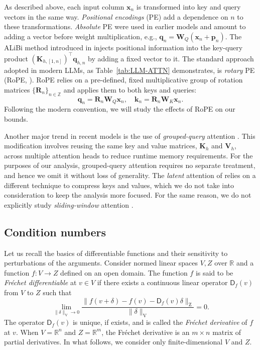 \documentclass[namedate,webpdf,imanum]{ima-authoring-template}
\newcommand{\Real}{\mathbb{R}}
\newcommand{\Z}{\mathbb{Z}}
\newcommand{\Matrix}[1]{\mathbf{#1}}
\newcommand{\trans}{\intercal}
\newcommand{\Norm}[3][]{#1\| #2 #1\|_{\mathrm{#3}}}
\newcommand{\Layer}[1]{\mathsf{#1}}
\numberwithin{equation}{section}
\begin{document}
As described above, each input column $\Matrix{x}_n$ is transformed into key and query vectors in the same way.
\emph{Positional encodings} (PE) add a dependence on $n$ to these transformations.
\emph{Absolute} PE were used in earlier models and amount to adding a vector before weight multiplication, e.g., $\Matrix{q}_{n} = \Matrix{W}_{Q} (\Matrix{x}_n + \Matrix{p}_n)$.
The ALiBi method introduced in \cite{press2021train} injects positional information into the key-query product $(\Matrix{K}_{h, [1,n]})^\trans \Matrix{q}_{h,n}$ by adding a fixed vector to it.
The standard approach adopted in modern LLMs, as Table~\ref{tab:LLM-ATTN} demonstrates, is \emph{rotary} PE (RoPE, \cite{su2024roformer}). 
RoPE relies on a pre-defined, fixed multiplicative group of rotation matrices $\{ \Matrix{R}_n \}_{n \in \Z}$ and applies them to both keys and queries:
\begin{equation*}
    \Matrix{q}_{n} = \Matrix{R}_n \Matrix{W}_{Q} \Matrix{x}_n, \quad \Matrix{k}_{n} = \Matrix{R}_n \Matrix{W}_{K} \Matrix{x}_n.
\end{equation*}
Following the modern convention, we will study the effects of RoPE on our bounds.

Another major trend in recent models is the use of \emph{grouped-query} attention \citep{shazeer2019fast, ainslie2023gqa}.
This modification involves reusing the same key and value matrices, $\Matrix{K}_h$ and $\Matrix{V}_h$, across multiple attention heads to reduce runtime memory requirements.
For the purposes of our analysis, grouped-query attention requires no separate treatment, and hence we omit it without loss of generality.
The \emph{latent} attention of \cite{liu2024deepseek} relies on a different technique to compress keys and values, which we do not take into consideration to keep the analysis more focused.
For the same reason, we do not explicitly study \emph{sliding-window} attention \citep{jiang2023mistral, jiang2024mixtral, riviere2024gemma}.

\subsection{Condition numbers}
\label{subsec:condition_numbers}
Let us recall the basics of differentiable functions and their sensitivity to perturbations of the arguments.
Consider normed linear spaces $V, Z$ over $\Real$ and a function $f : V \to Z$ defined on an open domain.
The function $f$ is said to be \emph{Fr\'echet differentiable} at $v \in V$ if there exists a continuous linear operator $\Layer{D}_f(v)$ from $V$ to $Z$ such that
\begin{equation*}
    \lim_{\Norm{\delta}{V} \to 0} \frac{\Norm{f(v + \delta) - f(v) - \Layer{D}_f(v)\delta}{Z}}{\Norm{\delta}{V}} = 0.
\end{equation*}
The operator $\Layer{D}_f(v)$ is unique, if exists, and is called the \emph{Fr\'echet derivative} of $f$ at $v$.
When $V = \Real^n$ and $Z = \Real^m$, the Fr\'echet derivative is an $m \times n$ matrix of partial derivatives.
In what follows, we consider only finite-dimensional $V$ and $Z$.
\end{document}
